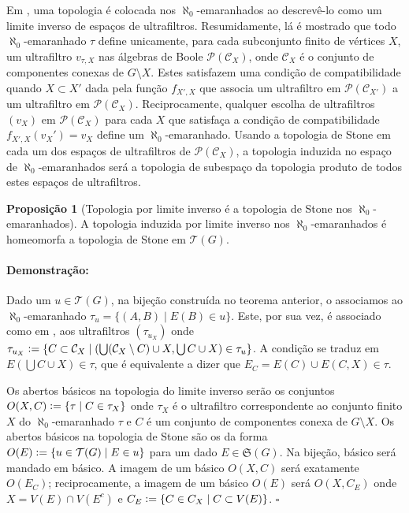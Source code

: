 \documentclass[11pt]{article}
\newcommand{\defeq}{\vcentcolon=}
\newcommand{\pulinho}{\vspace{.5cm}}
\theoremstyle{definition}
\theoremstyle{definition}
\theoremstyle{definition}
\newtheorem{prop}{Proposição}
\newenvironment{proposicao}{
\definecolor{shadecolor}{HTML}{FFDBDF}
\begin{shaded}
\begin{prop}
}
{
\end{prop}
\end{shaded}
}
\theoremstyle{definition}
\theoremstyle{definition}
\theoremstyle{definition}
\theoremstyle{definition}
\theoremstyle{definition}
\theoremstyle{definition}
\theoremstyle{definition}
\theoremstyle{definition}
\theoremstyle{definition}
\newenvironment{prova}{\paragraph{Demonstração:}}{\hfill$\square$ 
\pulinho
}
\begin{document}
Em \cite{Diestel2017}, uma topologia é colocada nos $\aleph_0$-emaranhados ao descrevê-lo como um limite inverso de espaços de ultrafiltros. Resumidamente, lá é mostrado que todo $\aleph_0$-emaranhado $\tau$ define unicamente, para cada subconjunto finito de vértices $X$, um ultrafiltro $v_{\tau,X}$ nas álgebras de Boole $\mathcal{P}(\mathcal{C}_X)$, onde $\mathcal{C}_X$ é o conjunto de componentes conexas de $G \setminus X$. Estes satisfazem uma condição de compatibilidade quando $X \subset X'$ dada pela função $f_{X',X}$ que associa um ultrafiltro em $\mathcal{P}(\mathcal{C}_{X'})$ a um ultrafiltro em $\mathcal{P}(\mathcal{C}_X)$. Reciprocamente, qualquer escolha de ultrafiltros $(v_X)$ em $\mathcal{P}(\mathcal{C}_X)$ para cada $X$ que satisfaça a condição de compatibilidade $f_{X',X}(v_X') = v_X$ define um $\aleph_0$-emaranhado. Usando a topologia de Stone em cada um dos espaços de ultrafiltros de $\mathcal{P}(\mathcal{C}_X)$, a topologia induzida no espaço de $\aleph_0$-emaranhados será a topologia de subespaço da topologia produto de todos estes espaços de ultrafiltros.

\begin{proposicao}[Topologia por limite inverso é a topologia de Stone nos $\aleph_0$-emaranhados]
    A topologia induzida por limite inverso nos $\aleph_0$-emaranhados é homeomorfa a topologia de Stone em $\mathcal{T}(G)$.
\end{proposicao}
\begin{prova}
    Dado um $u \in \mathcal{T}(G)$, na bijeção construída no teorema anterior, o associamos ao $\aleph_0$-emaranhado $\tau_u = \{(A,B) \mid E(B) \in u\}$. Este, por sua vez, é associado como em \cite{Diestel2017}, aos ultrafiltros $(\tau_{u_{X}})$ onde $\tau_{u_{X}} \defeq \{C \subset \mathcal{C}_X \mid  (\bigcup(\mathcal{C}_X \setminus C) \cup X, \bigcup C  \cup X) \in \tau_u\}$. A condição se traduz em $E(\bigcup C  \cup X) \in \tau$, que é equivalente a dizer que $E_C = E(C) \cup E(C,X) \in \tau$. 

    Os abertos básicos na topologia do limite inverso serão os conjuntos $O(X,C) \defeq \{\tau \mid C \in \tau_X\}$ onde $\tau_X$ é o ultrafiltro correspondente ao conjunto finito $X$ do $\aleph_0$-emaranhado $\tau$ e $C$ é um conjunto de componentes conexa de $G \setminus X$. Os abertos básicos na topologia de Stone são os da forma $O(E) \defeq \{u \in \mathcal{T}(G) \mid E \in u\}$ para um dado $E \in \mathfrak{S}(G)$. Na bijeção, básico será mandado em básico. A imagem de um básico $O(X,C)$ será exatamente $O(E_C)$; reciprocamente, a imagem de um básico $O(E)$ será $O(X,C_E)$ onde $X = V(E) \cap V(E^c)$ e $C_E \defeq \{C \in C_X \mid C \subset V(E)\}$.
\end{prova}
\end{document}
